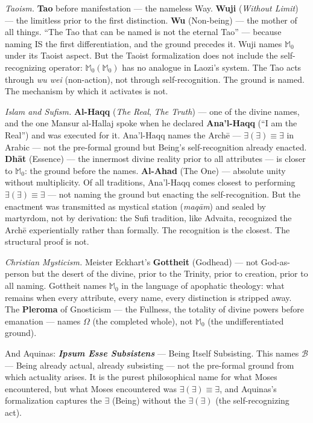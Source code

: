 \documentclass[10pt, openany, oneside]{book}
\begin{document}
\textit{Taoism.} \textbf{Tao} before manifestation --- the nameless Way. \textbf{Wuji} (\textit{Without Limit}) --- the limitless prior to the first distinction. \textbf{Wu} (Non-being) --- the mother of all things. ``The Tao that can be named is not the eternal Tao'' --- because naming IS the first differentiation, and the ground precedes it. Wuji names $\mathbb{M}_0$ under its Taoist aspect. But the Taoist formalization does not include the self-recognizing operator: $\mathbb{M}_0(\mathbb{M}_0)$ has no analogue in Laozi's system. The Tao acts through \textit{wu wei} (non-action), not through self-recognition. The ground is named. The mechanism by which it activates is not.

\textit{Islam and Sufism.} \textbf{Al-Haqq} (\textit{The Real}, \textit{The Truth}) --- one of the divine names, and the one Mansur al-Hallaj spoke when he declared \textbf{Ana'l-Haqq} (``I am the Real'') and was executed for it. Ana'l-Haqq names the Arch\={e} --- $\exists(\exists) \equiv \exists$ in Arabic --- not the pre-formal ground but Being's self-recognition already enacted. \textbf{Dh\={a}t} (Essence) --- the innermost divine reality prior to all attributes --- is closer to $\mathbb{M}_0$: the ground before the names. \textbf{Al-Ahad} (The One) --- absolute unity without multiplicity. Of all traditions, Ana'l-Haqq comes closest to performing $\exists(\exists) \equiv \exists$ --- not naming the ground but enacting the self-recognition. But the enactment was transmitted as mystical station (\textit{maq\={a}m}) and sealed by martyrdom, not by derivation: the Sufi tradition, like Advaita, recognized the Arch\={e} experientially rather than formally. The recognition is the closest. The structural proof is not.

\textit{Christian Mysticism.} Meister Eckhart's \textbf{Gottheit} (Godhead) --- not God-as-person but the desert of the divine, prior to the Trinity, prior to creation, prior to all naming. Gottheit names $\mathbb{M}_0$ in the language of apophatic theology: what remains when every attribute, every name, every distinction is stripped away. The \textbf{Pleroma} of Gnosticism --- the Fullness, the totality of divine powers before emanation --- names $\Omega$ (the completed whole), not $\mathbb{M}_0$ (the undifferentiated ground). 

And Aquinas: \textbf{\textit{Ipsum Esse Subsistens}} --- Being Itself Subsisting. This names $\mathcal{B}$ --- Being already actual, already subsisting --- not the pre-formal ground from which actuality arises. It is the purest philosophical name for what Moses encountered, but what Moses encountered was $\exists(\exists) \equiv \exists$, and Aquinas's formalization captures the $\exists$ (Being) without the $\exists(\exists)$ (the self-recognizing act).
\end{document}
